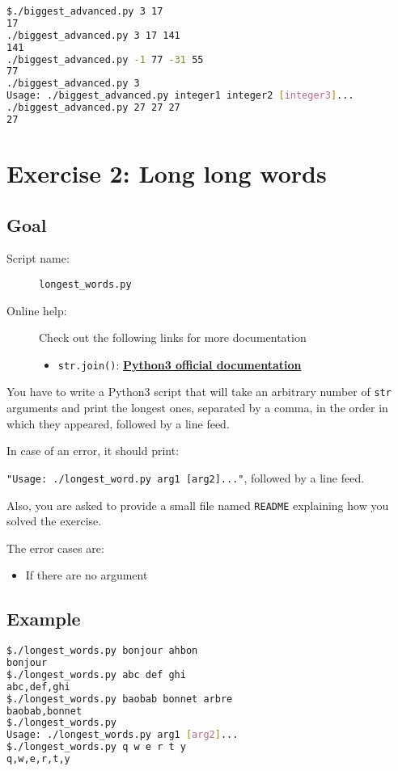 \documentclass[12pt]{article}
\let\oldhref\href
\renewcommand{\href}[2]{\oldhref{#1}{\bfseries#2}}
\begin{document}
\begin{lstlisting}[language=bash]
$./biggest_advanced.py 3 17
17
./biggest_advanced.py 3 17 141
141
./biggest_advanced.py -1 77 -31 55
77
./biggest_advanced.py 3
Usage: ./biggest_advanced.py integer1 integer2 [integer3]...
./biggest_advanced.py 27 27 27
27
\end{lstlisting}


\section{Exercise 2: Long long words}
\subsection{Goal}

\begin{description}
        \item[Script name:] \texttt{longest\_words.py}
        \item[Online help:] Check out the following links for more documentation
	\begin{itemize}
		\item \texttt{str.join()}: \href{https://docs.python.org/3.5/library/stdtypes.html\#str.join}{Python3 official documentation}
	\end{itemize}
\end{description}

You have to write a Python3 script that will take an arbitrary number of \texttt{str} arguments and print the longest ones, separated by a comma,  in the order in which they appeared, followed by a line feed.

In case of an error, it should print:

\texttt{"Usage: ./longest\_word.py arg1 [arg2]..."}, followed by a line feed.

Also, you are asked to provide a small file named \texttt{README} explaining how you solved the exercise.

The error cases are:

\begin{itemize}
	\item If there are no argument
\end{itemize}

\subsection{Example}

\begin{lstlisting}[language=bash]
$./longest_words.py bonjour ahbon
bonjour
$./longest_words.py abc def ghi
abc,def,ghi
$./longest_words.py baobab bonnet arbre
baobab,bonnet
$./longest_words.py 
Usage: ./longest_words.py arg1 [arg2]...
$./longest_words.py q w e r t y
q,w,e,r,t,y
\end{lstlisting}
\end{document}
